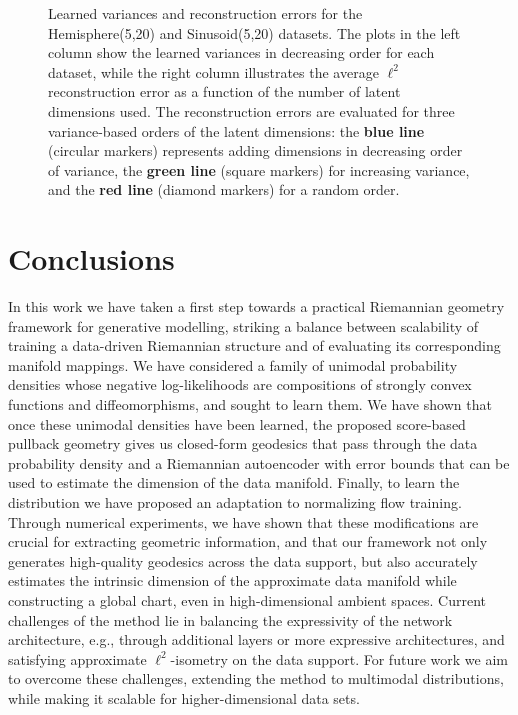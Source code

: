 \begin{figure}[t!]
            \caption{Learned variances and reconstruction errors for the Hemisphere(5,20) and Sinusoid(5,20) datasets. The plots in the left column show the learned variances in decreasing order for each dataset, while the right column illustrates the average $\ell^2$ reconstruction error as a function of the number of latent dimensions used. The reconstruction errors are evaluated for three variance-based orders of the latent dimensions: the \textbf{blue line} (circular markers) represents adding dimensions in decreasing order of variance, the \textbf{green line} (square markers) for increasing variance, and the \textbf{red line} (diamond markers) for a random order.\vspace{-2em}
        }
        
            \label{fig:combined_plot}
        \end{figure}

        \section{Conclusions}
\label{sec:conclusions}

In this work we have taken a first step towards a practical Riemannian geometry framework for generative modelling, striking a balance between scalability of training a data-driven Riemannian structure and of evaluating its corresponding manifold mappings. We have considered a family of unimodal probability densities whose negative log-likelihoods are compositions of strongly convex functions and diffeomorphisms, and sought to learn them. We have shown that once these unimodal densities have been learned, the proposed score-based pullback geometry gives us closed-form geodesics that pass through the data probability density and a Riemannian autoencoder with error bounds that can be used to estimate the dimension of the %
data manifold. Finally, to learn the distribution we have proposed an adaptation to normalizing flow training. Through numerical experiments, we have shown that these modifications are crucial for extracting geometric information, and that our framework not only generates high-quality geodesics across the data support, but also accurately estimates the intrinsic dimension of the approximate data manifold while constructing a global chart, even in high-dimensional ambient spaces. Current challenges of the method lie in balancing the expressivity of the network architecture, e.g., through additional layers or more expressive architectures, and satisfying approximate $\ell^2$-isometry on the data support. For future work we aim to overcome these challenges, extending the method to multimodal distributions, while making it scalable for higher-dimensional data sets.
